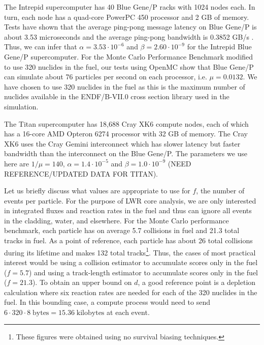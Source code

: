 \documentclass[3p]{elsarticle}
\begin{document}
The Intrepid supercomputer has 40 Blue Gene/P racks with 1024 nodes each. In
turn, each node has a quad-core PowerPC 450 processor and 2 GB of memory. Tests
have shown that the average ping-pong message latency on Blue Gene/P is about
3.53 microseconds and the average ping-pong bandwidth is 0.3852 GB/s
\cite{bluegene}. Thus, we can infer that $\alpha = 3.53 \cdot 10^{-6}$ and
$\beta = 2.60 \cdot 10^{-9}$ for the Intrepid Blue Gene/P supercomputer. For the
Monte Carlo Performance Benchmark modified to use 320 nuclides in the fuel, our
tests using OpenMC show that Blue Gene/P can simulate about 76 particles per
second on each processor, i.e. $\mu = 0.0132$. We have chosen to use 320
nuclides in the fuel as this is the maximum number of nuclides available in the
ENDF/B-VII.0 cross section library used in the simulation.

The Titan supercomputer has 18,688 Cray XK6 compute nodes, each of which has a
16-core AMD Opteron 6274 processor with 32 GB of memory. The Cray XK6 uses the
Cray Gemini interconnect which has slower latency but faster bandwidth than the
interconnect on the Blue Gene/P. The parameters we use here are $1/\mu = 140$,
$\alpha = 1.4 \cdot 10^{-5}$ and $\beta = 1.0 \cdot 10^{-9}$ (NEED
REFERENCE/UPDATED DATA FOR TITAN).

Let us briefly discuss what values are appropriate to use for $f$, the number of
events per particle. For the purpose of LWR core analysis, we are only
interested in integrated fluxes and reaction rates in the fuel and thus can
ignore all events in the cladding, water, and elsewhere. For the Monte Carlo
performance benchmark, each particle has on average 5.7 collisions in fuel and
21.3 total tracks in fuel. As a point of reference, each particle has about 26
total collisions during its lifetime and makes 132 total tracks\footnote{These
  figures were obtained using no survival biasing techniques.}. Thus, the cases
of most practical interest would be using a collision estimator to accumulate
scores only in the fuel ($f = 5.7$) and using a track-length estimator to
accumulate scores only in the fuel ($f = 21.3$). To obtain an upper bound on
$d$, a good reference point is a depletion calculation where six reaction rates
are needed for each of the 320 nuclides in the fuel. In this bounding case, a
compute process would need to send $6 \cdot 320 \cdot 8 \; \text{bytes} = 15.36
\; \text{kilobytes}$ at each event.
\end{document}

